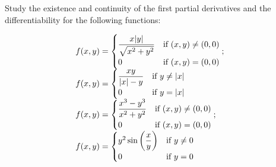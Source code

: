 \documentclass[12pt]{article}
\begin{document}
\section{}
Study the existence and continuity of the first partial derivatives and the differentiability for the following functions:

\[
\begin{array}{ll}
\displaystyle f(x, y) = \begin{cases} 
                        \dfrac{x|y|}{\sqrt{x^2 + y^2}} & \text{if } (x, y) \neq (0, 0) \\[0.5em]
                        0 & \text{if } (x, y) = (0, 0)
                        \end{cases}; &
\cr
\displaystyle f(x, y) = \begin{cases}
                        \dfrac{xy}{|x| - y} & \text{if } y \neq |x| \\[0.5em]
                        0 & \text{if } y = |x|
                        \end{cases} &
\cr
\displaystyle f(x, y) = \begin{cases}
                        \dfrac{x^3 - y^3}{x^2 + y^2} & \text{if } (x, y) \neq (0, 0) \\[0.5em]
                        0 & \text{if } (x, y) = (0, 0)
                        \end{cases}; &
\cr
\displaystyle f(x, y) = \begin{cases}
                        y^2 \sin\left(\dfrac{x}{y}\right) & \text{if } y \neq 0 \\[0.5em]
                        0 & \text{if } y = 0
                        \end{cases}
\end{array}
\]
\end{document}
